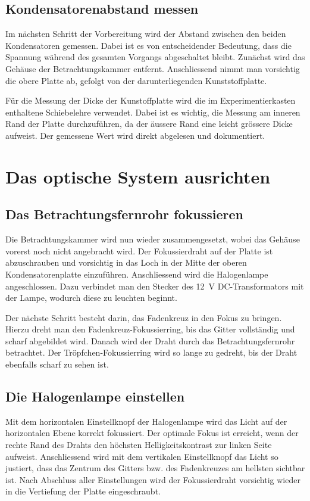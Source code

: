 \subsection{Kondensatorenabstand messen}\label{sub:kondensatorenabstand}
Im nächsten Schritt der Vorbereitung wird der Abstand zwischen den beiden Kondensatoren gemessen. Dabei ist es von entscheidender Bedeutung, dass die Spannung während des gesamten Vorgangs abgeschaltet bleibt. Zunächst wird das Gehäuse der Betrachtungskammer entfernt. Anschliessend nimmt man vorsichtig die obere Platte ab, gefolgt von der darunterliegenden Kunststoffplatte.

Für die Messung der Dicke der Kunstoffplatte wird die im Experimentierkasten enthaltene Schiebelehre verwendet. Dabei ist es wichtig, die Messung am inneren Rand der Platte durchzuführen, da der äussere Rand eine leicht grössere Dicke aufweist. Der gemessene Wert wird direkt abgelesen und dokumentiert.

\section{Das optische System ausrichten}\label{sec:optischesSystem}
\subsection{Das Betrachtungsfernrohr fokussieren}
Die Betrachtungskammer wird nun wieder zusammengesetzt, wobei das Gehäuse vorerst noch nicht angebracht wird. Der Fokussierdraht auf der Platte ist abzuschrauben und vorsichtig in das Loch in der Mitte der oberen Kondensatorenplatte einzuführen. Anschliessend wird die Halogenlampe angeschlossen. Dazu verbindet man den Stecker des 12~V DC-Transformators mit der Lampe, wodurch diese zu leuchten beginnt.

Der nächste Schritt besteht darin, das Fadenkreuz in den Fokus zu bringen. Hierzu dreht man den Fadenkreuz-Fokussierring, bis das Gitter vollständig und scharf abgebildet wird. Danach wird der Draht durch das Betrachtungsfernrohr betrachtet. Der Tröpfchen-Fokussierring wird so lange zu gedreht, bis der Draht ebenfalls scharf zu sehen ist.

\subsection{Die Halogenlampe einstellen}\label{sub:Halogenlampe}
Mit dem horizontalen Einstellknopf der Halogenlampe wird das Licht auf der horizontalen Ebene korrekt fokussiert. Der optimale Fokus ist erreicht, wenn der rechte Rand des Drahts den höchsten Helligkeitskontrast zur linken Seite aufweist. Anschliessend wird mit dem vertikalen Einstellknopf das Licht so justiert, dass das Zentrum des Gitters bzw. des Fadenkreuzes am hellsten sichtbar ist. Nach Abschluss aller Einstellungen wird der Fokussierdraht vorsichtig wieder in die Vertiefung der Platte eingeschraubt.

